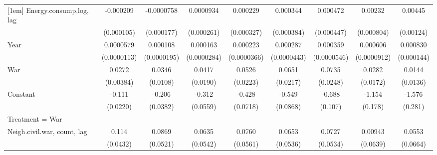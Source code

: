 \begin{table}[htbp]
\begin{tabular}{l*{8}{c}}
[1em]
Energy.consump,log, lag             &   -0.000209\sym{**} &  -0.0000758         &   0.0000934         &    0.000229         &    0.000344         &    0.000472         &     0.00232\sym{***}&     0.00445\sym{***}\\
                    &  (0.000105)         &  (0.000177)         &  (0.000261)         &  (0.000327)         &  (0.000384)         &  (0.000447)         &  (0.000804)         &   (0.00124)         \\
[1em]
Year                &   0.0000579\sym{***}&    0.000108\sym{***}&    0.000163\sym{***}&    0.000223\sym{***}&    0.000287\sym{***}&    0.000359\sym{***}&    0.000606\sym{***}&    0.000830\sym{***}\\
                    & (0.0000113)         & (0.0000195)         & (0.0000284)         & (0.0000366)         & (0.0000443)         & (0.0000546)         & (0.0000912)         &  (0.000144)         \\
[1em]
War         &      0.0272\sym{***}&      0.0346\sym{***}&      0.0417\sym{**} &      0.0526\sym{**} &      0.0651\sym{***}&      0.0735\sym{***}&      0.0282         &      0.0144         \\
                    &   (0.00384)         &    (0.0108)         &    (0.0190)         &    (0.0223)         &    (0.0217)         &    (0.0248)         &    (0.0172)         &    (0.0136)         \\
[1em]
Constant            &      -0.111\sym{***}&      -0.206\sym{***}&      -0.312\sym{***}&      -0.428\sym{***}&      -0.549\sym{***}&      -0.688\sym{***}&      -1.154\sym{***}&      -1.576\sym{***}\\
                    &    (0.0220)         &    (0.0382)         &    (0.0559)         &    (0.0718)         &    (0.0868)         &     (0.107)         &     (0.178)         &     (0.281)         \\
\hline
Treatment = War                &                     &                     &                     &                     &                     &                     &                     &                     \\
Neigh.civil.war, count, lag&       0.114\sym{***}&      0.0869\sym{*}  &      0.0635         &      0.0760         &      0.0653         &      0.0727         &     0.00943         &      0.0553         \\
                    &    (0.0432)         &    (0.0521)         &    (0.0542)         &    (0.0561)         &    (0.0536)         &    (0.0534)         &    (0.0639)         &    (0.0664)         \\

\end{tabular}
\end{table}
